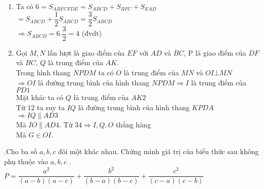 \begin{ex}
{\begin{enumerate}
$\Rightarrow OI$ là đường trung tuyến của $\Delta $ nên $OI$ cũng là đường cao\\
$\Rightarrow OI\bot EF\Rightarrow OI\bot DC$
		\item Ta có
$6=S_{ABFCFDE}=S_{ABCD}+S_{BFC}+S_{EAD}$\\
$=S_{ABCD}+\dfrac{1}{2}S_{ABCD}=\dfrac{3}{2}S_{ABCD}$\\
$\Rightarrow S_{ABCD}=6.\dfrac{3}{2}=4$ (đvdt)
\item Gọi $M,  N$ lần lượt là giao điểm của $EF$ với $AD$ và $BC$, P là giao điểm của $DF$ và $BC$, $Q$ là trung điểm của $AK$.\\
Trong hình thang  $NPDM$ ta có $O$ là trung điểm của $MN$ và $OI\bot MN$\\
$\Rightarrow OI$ là đường trung bình của hình thang $NPDM\Rightarrow I$ là trung điểm của $PD1$\\
Mặt khác ta có $Q$ là trung điểm của $AK2$\\
Từ $12$ ta suy ta $IQ$ là đường trung bình của hình thang $KPDA$\\
$\Rightarrow IQ\parallel AD3$\\
Mà $IO\parallel AD4$. Từ $34\Rightarrow I,Q,O$ thẳng hàng\\
Mà $G\in OI.$
			\end{enumerate}
	}
\end{ex}
\begin{ex}%
	.Cho ba số $a,b,c$ đôi một khác nhau. Chứng minh giá trị của biểu thức sau không phụ thuộc vào $a,b,c$ .
$P=\dfrac{a^2}{\left(a-b\right)\left(a-c\right)}+\dfrac{b^2}{\left(b-a\right)\left(b-c\right)}+\dfrac{c^2}{\left(c-a\right)\left(c-b\right)}$
\end{ex}